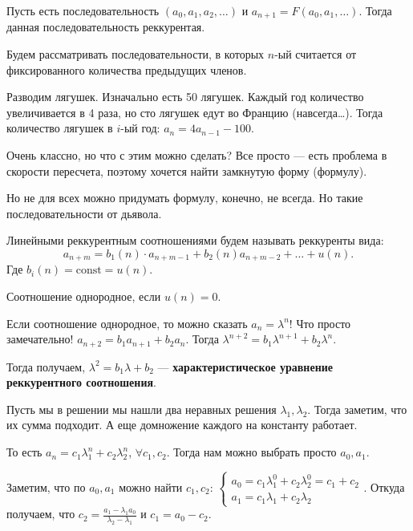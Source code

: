 \begin{definition}
Пусть есть последовательность $(a_0, a_1, a_2,\ldots)$ и $a_{n+1} = F(a_0,a_1,\ldots)$. Тогда данная последовательность реккурентая.
\end{definition}
\slashn
Будем рассматривать последовательности, в которых $n$-ый считается от фиксированного количества предыдущих членов.
 \begin{example}
     Разводим лягушек. Изначально есть 50 лягушек. Каждый год количество увеличивается в 4 раза, но сто лягушек едут во Францию (навсегда\ldots). Тогда количество лягушек в $i$-ый год:  $a_n = 4a_{n-1} - 100$.
\end{example}
\slashn
Очень классно, но что с этим можно сделать? Все просто --- есть проблема в скорости пересчета, поэтому хочется найти замкнутую форму (формулу).

Но не для всех можно придумать формулу, конечно, не всегда. Но такие последовательности от дьявола.
\begin{definition}
    Линейными реккурентным соотношениями будем называть реккуренты вида: \[
        a_{n+m} = b_1(n) \cdot a_{n+m-1} + b_2(n)a_{n+m-2} + \ldots + u(n)
    .\]Где $b_i(n) = \text{const} = u(n)$.
\end{definition}
\begin{definition}
    Соотношение однородное, если $u(n) = 0$.
\end{definition}
\slashn
Если соотношение однородное, то можно сказать $a_n = \lambda^n$! Что просто замечательно!
     $a_{n+2} = b_1 a_{n+1} + b_2 a_n$. Тогда $\lambda^{n+2} = b_1 \lambda^{n+1} + b_2 \lambda^{n}$.
     
     Тогда получаем, $\lambda^2 = b_1 \lambda + b_2$ --- \textbf{характеристическое уравнение реккурентного соотношения}. 

     Пусть мы в решении мы нашли два неравных решения $\lambda_1, \lambda_2$. Тогда заметим, что их сумма подходит. А еще домножение каждого на константу работает.

     То есть  $a_n = c_1 \lambda_1^n + c_2 \lambda_2^n$, $\forall c_1, c_2$. Тогда нам можно выбрать просто $a_0, a_1$.

     Заметим, что по $a_0, a_1$ можно найти $c_1, c_2$: $\begin{cases} a_0 = c_1 \lambda_1^0 + c_2 \lambda_2^0 =c_1 + c_2 
     \\ a_1 = c_1 \lambda_1 + c_2 \lambda_2\end{cases}$. Откуда получаем, что $c_2 = \frac{a_1-\lambda_1a_0}{\lambda_2 - \lambda_1}$ и $c_1 = a_0 - c_2$.


